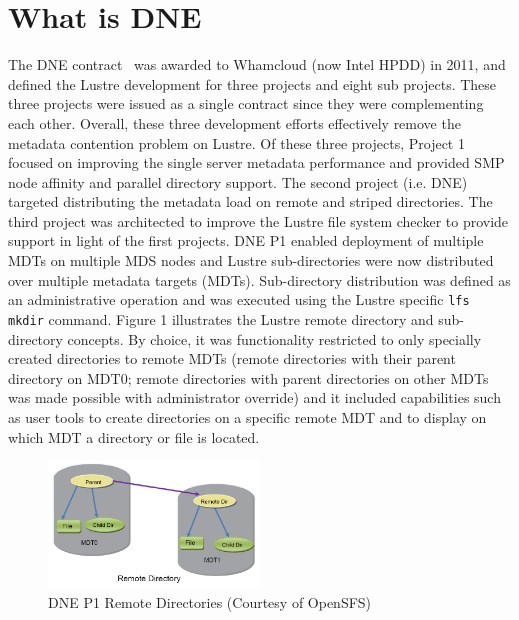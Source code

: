 \documentclass[conference,compsoc]{IEEEtran}
\def\code#1{\texttt{#1}}
\begin{document}
\section{What is DNE}

The DNE contract~\cite{dne-contract} was awarded to Whamcloud (now Intel HPDD)
in 2011, and defined the Lustre development for three projects and eight
sub projects. These three projects were issued as a single contract since they
were complementing each other. Overall, these three development efforts
effectively remove the metadata contention problem on Lustre. Of these three
projects, Project 1 focused on improving the single server metadata performance
and provided SMP node affinity and parallel directory support. The second
project (i.e. DNE) targeted distributing the metadata load on remote and
striped directories. The third project was architected to improve the Lustre
file system checker to provide support in light of the first projects.  DNE P1
enabled deployment of multiple MDTs on multiple MDS nodes and Lustre
sub-directories were now distributed over multiple metadata targets (MDTs).
Sub-directory distribution was defined as an administrative operation and was
executed using the Lustre specific \code{lfs mkdir} command. Figure 1 illustrates the
Lustre remote directory and sub-directory concepts. By choice, it was
functionality restricted to only specially created directories to remote MDTs
(remote directories with their parent directory on MDT0; remote directories
with parent directories on other MDTs was made possible with administrator
override) and it included capabilities such as user tools to create directories
on a specific remote MDT and to display on which MDT a directory or file is
located. 


\begin{figure}[!ht]
  \centering
    \includegraphics[width=0.5\textwidth]{figs/dnep1}
  \caption{DNE P1 Remote Directories (Courtesy of OpenSFS)}
\end{figure}
 
\end{document}

